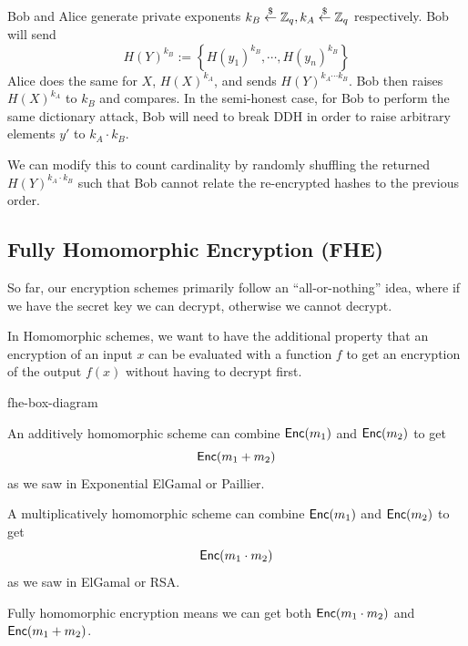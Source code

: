 Bob and Alice generate private exponents $k_B\overset{\$}{\leftarrow} \mathbb Z_q, k_A\overset{\$}{\leftarrow} \mathbb Z_q$ respectively. Bob will send
\[H(Y)^{k_B} := \left\{ H(y_1)^{k_B}, \cdots, H(y_n)^{k_B} \right\}\]
Alice does the same for $X$, $H(X)^{k_A}$, and sends $H(Y)^{k_A\cdots k_B}$. Bob then raises $H(X)^{k_A}$ to $k_B$ and compares. In the semi-honest case, for Bob to perform the same dictionary attack, Bob will need to break DDH in order to raise arbitrary elements $y'$ to $k_A\cdot k_B$.

We can modify this to count cardinality by randomly shuffling the returned $H(Y)^{k_A\cdot k_B}$ such that Bob cannot relate the re-encrypted hashes to the previous order.



\subsection{Fully Homomorphic Encryption (FHE)}

So far, our encryption schemes primarily follow an ``all-or-nothing'' idea, where if we have the secret key we can decrypt, otherwise we cannot decrypt.

In Homomorphic schemes, we want to have the additional property that an encryption of an input $x$ can be evaluated with a function $f$ to get an encryption of the output $f(x)$ without having to decrypt first.

\begin{center}
\begin{bbrenv}{fhe-box-diagram}
\begin{bbrbox}[name=Eval, namepos=center]
\end{bbrbox}
\end{bbrenv}
\end{center}

An additively homomorphic scheme can combine $\operatorname{\mathsf{Enc}}(m_1)$ and $\operatorname{\mathsf{Enc}}(m_2)$ to get
\[\operatorname{\mathsf{Enc}}(m_1 + m_2)\]
as we saw in Exponential ElGamal or Paillier.

A multiplicatively homomorphic scheme can combine $\operatorname{\mathsf{Enc}}(m_1)$ and $\operatorname{\mathsf{Enc}}(m_2)$ to get
\[\operatorname{\mathsf{Enc}}(m_1 \cdot m_2)\]
as we saw in ElGamal or RSA.

Fully homomorphic encryption means we can get both $\operatorname{\mathsf{Enc}}(m_1 \cdot m_2)$ and $\operatorname{\mathsf{Enc}}(m_1 + m_2)$.

